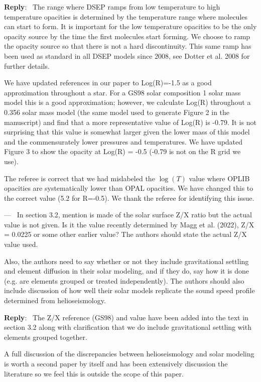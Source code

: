 \documentclass[11pt]{article}
\newcounter{reviewer}
\newcounter{point}[reviewer]
\renewcommand{\thepoint}{\arabic{point})}
\newenvironment{point}
   {\refstepcounter{point} \bigskip \noindent {\textbf{Referee~Point~\thepoint} } ---\ }
   {\par }
\newenvironment{reply}
   {\medskip \noindent \begin{sf}\textbf{Reply}:\  }
   {\medskip \end{sf}}
\begin{document}
\begin{reply}
	The range where DSEP ramps from low temperature to high temperature
	opacities is determined by the temperature range where molecules can start
	to form. It is important for the low temperature opacities to be the only
	opacity source by the time the first molecules start forming. We choose to
	ramp the opacity source so that there is not a hard discontinuity. This
	same ramp has been used as standard in all DSEP models since 2008, see
	Dotter et al. 2008 for further details.

	We have updated references in our paper to Log(R)=-1.5 as a good
	approximation throughout a star. For a GS98 solar composition 1 solar mass
	model this is a good approximation; however, we calculate Log(R) throughout
	a 0.356 solar mass model (the same model used to generate Figure 2 in the
	manuscript) and find that a more representative value of Log(R) is -0.79.
	It is not surprising that this value is somewhat larger given the lower
	mass of this model and the commensurately lower pressures and temperatures.
	We have updated Figure 3 to show the opacity at Log(R) = -0.5 (-0.79 is not
	on the R grid we use).

	The referee is correct that we had mislabeled the $\log(T)$ value where
	OPLIB opacities are systematically lower than OPAL opacities. We have
	changed this to the correct value (5.2 for R=-0.5). We thank the referee
	for identifying this issue.
\end{reply}

\begin{point}
	In section 3.2, mention is made of the solar surface Z/X ratio but the actual
	value is not given. Is it the value recently determined by Magg et al.
	(2022), Z/X = 0.0225 or some other earlier value? The authors should state
	the actual Z/X value used.

	Also, the authors need to say whether or not they include gravitational
	settling and element diffusion in their solar modeling, and if they do, say
	how it is done (e.g. are elements grouped or treated independently). The
	authors should also include discussion of how well their solar models
	replicate the sound speed profile determined from helioseismology.
	\label{pt:ZX}
\end{point}

\begin{reply}
	The Z/X reference (GS98) and value have been added into the text in section 3.2 along
	with clarification that we do include gravitational settling with elements
	grouped together.

	A full discussion of the discrepancies between helioseismology and solar
	modeling is worth a second paper by itself and has been extensively
	discussion the literature so we feel this is outside the scope
	of this paper.
\end{reply}
\end{document}
